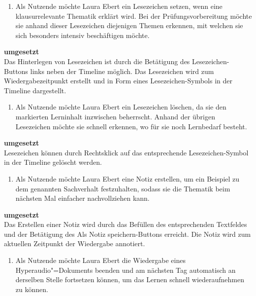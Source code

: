 \vspace{0.25cm}
\begin{enumerate}[resume*]
\item \label{US-Lesezeichen-Eval} Als Nutzende möchte Laura Ebert ein Lesezeichen setzen, wenn eine klausurrelevante Thematik erklärt wird. Bei der Prüfungsvorbereitung möchte sie anhand dieser Lesezeichen diejenigen Themen erkennen, mit welchen sie sich besonders intensiv beschäftigen möchte.
\end{enumerate}
\vspace{-0.1cm}
\textbf{umgesetzt}\\
Das Hinterlegen von Lesezeichen ist durch die Betätigung des Lesezeichen-Buttons links neben der Timeline möglich. Das Lesezeichen wird zum Wiedergabezeitpunkt erstellt und in Form eines Lesezeichen-Symbols in der Timeline dargestellt.
\vspace{0.25cm}
\begin{enumerate}[resume*]
\item \label{US-Lesezeichen-Loeschen-Eval} Als Nutzende möchte Laura Ebert ein Lesezeichen löschen, da sie den markierten Lerninhalt inzwischen beherrscht. Anhand der übrigen Lesezeichen möchte sie schnell erkennen, wo für sie noch Lernbedarf besteht.
\end{enumerate}
\vspace{-0.1cm}
\textbf{umgesetzt}\\
Lesezeichen können durch Rechtsklick auf das entsprechende Lesezeichen-Symbol in der Timeline gelöscht werden.
\vspace{0.25cm}
\begin{enumerate}[resume*]
\item \label{US-Notiz-S-Eval} Als Nutzende möchte Laura Ebert eine Notiz erstellen, um ein Beispiel zu dem genannten Sachverhalt festzuhalten, sodass sie die Thematik beim nächsten Mal einfacher nachvollziehen kann.
\end{enumerate}
\vspace{-0.1cm}
\textbf{umgesetzt}\\
Das Erstellen einer Notiz wird durch das Befüllen des entsprechenden Textfeldes und der Betätigung des \glqq Als Notiz speichern\grqq{}-Buttons erreicht. Die Notiz wird zum aktuellen Zeitpunkt der Wiedergabe annotiert.
\vspace{0.25cm}
\begin{enumerate}[resume*]
\item \label{US-Fortsetzen-Eval} Als Nutzende möchte Laura Ebert die Wiedergabe eines Hyperaudio"=Dokuments beenden und am nächsten Tag automatisch an derselben Stelle fortsetzen können, um das Lernen schnell wiederaufnehmen zu können.
\end{enumerate}
